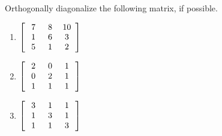 \begin{Exercise}
Orthogonally diagonalize the following matrix, if possible.
\begin{enumerate}[label=(\alph*)]
\item $\left[\begin{array}{wc{10pt}wc{10pt}wc{10pt}}
7 & 8 & 10\\
1 & 6 & 3\\
5 & 1 & 2
\end{array}\right]$
\item $\left[\begin{array}{wc{10pt}wc{10pt}wc{10pt}}
2 & 0 & 1\\
0 & 2 & 1\\
1 & 1 & 1
\end{array}\right]$
\item $\left[\begin{array}{wc{10pt}wc{10pt}wc{10pt}}
3 & 1 & 1\\
1 & 3 & 1\\
1 & 1 & 3
\end{array}\right]$
\end{enumerate}
\end{Exercise}
